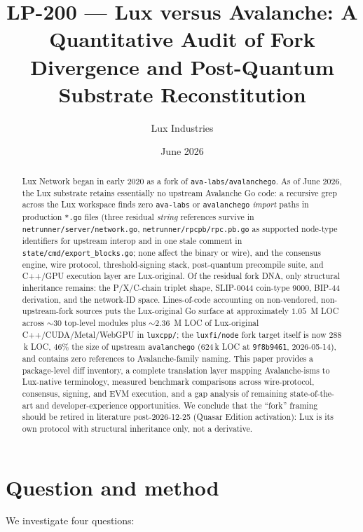 \documentclass[11pt,a4paper]{article}
\title{LP-200 --- Lux versus Avalanche: A Quantitative Audit of
Fork Divergence and Post-Quantum Substrate Reconstitution}
\author{Lux Industries}
\date{June 2026}
\begin{document}
\luxcoverpage

\maketitle

\begin{abstract}
Lux Network began in early 2020 as a fork of \texttt{ava-labs/avalanchego}.
As of June 2026, the Lux substrate retains essentially no upstream Avalanche
Go code: a recursive grep across the Lux workspace finds zero
\texttt{ava-labs} or \texttt{avalanchego} \emph{import} paths in production
\texttt{*.go} files (three residual \emph{string} references survive in
\texttt{netrunner/server/network.go}, \texttt{netrunner/rpcpb/rpc.pb.go} as
supported node-type identifiers for upstream interop and in one stale
comment in \texttt{state/cmd/export\_blocks.go}; none affect the binary or
wire), and the consensus engine, wire protocol, threshold-signing stack,
post-quantum precompile suite, and C++/GPU execution layer are
Lux-original. Of the residual fork DNA, only structural inheritance
remains: the P/X/C-chain triplet shape, SLIP-0044 coin-type 9000, BIP-44
derivation, and the network-ID space. Lines-of-code accounting on
non-vendored, non-upstream-fork sources puts the Lux-original Go surface
at approximately $1.05$~M LOC across $\sim$30 top-level modules plus
$\sim$2.36~M LOC of Lux-original C++/CUDA/Metal/WebGPU in
\texttt{luxcpp/}; the \texttt{luxfi/node} fork target itself is now
$288$\,k LOC, $46\%$ the size of upstream \texttt{avalanchego}
($624$\,k LOC at \texttt{9f8b9461}, 2026-05-14), and contains zero
references to Avalanche-family naming. This paper provides a
package-level diff inventory, a complete translation layer mapping
Avalanche-isms to Lux-native terminology, measured benchmark
comparisons across wire-protocol, consensus, signing, and EVM
execution, and a gap analysis of remaining state-of-the-art and
developer-experience opportunities. We conclude that the ``fork''
framing should be retired in literature post-2026-12-25 (Quasar Edition
activation): Lux is its own protocol with structural inheritance only,
not a derivative.
\end{abstract}

\tableofcontents

\section{Question and method}
\label{sec:question}

We investigate four questions:
\end{document}
